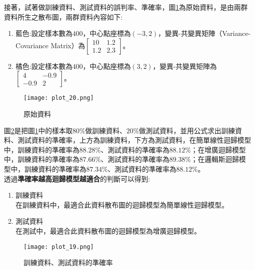 \documentclass[12pt, a4paper]{article}
\begin{document}
接著，試著做訓練資料、測試資料的誤判率、準確率，圖\;\ref{fig:plot_22.png}\;為原始資料，是由兩群資料所生之散布圖，兩群資料內容如下\;:
\begin{enumerate}
\item 藍色\;:\;設定樣本數為\;$400$\;，中心點座標為\;$(-3,2)$\;，變異\;-\;共變異矩陣（Variance-Covariance Matrix）為\;$\begin{bmatrix}10 & 1.2 \\1.2 & 2.3 \end{bmatrix}$\;。
\item 橘色\;:\;設定樣本數為\;$400$\;，中心點座標為\;$(3,2)$\;，變異\;-\;共變異矩陣為\;$\begin{bmatrix}4 & -0.9 \\-0.9 & 2 \end{bmatrix}$\;。
\end{enumerate}

\begin{figure}[H]
\centering
\texttt{[image: plot\_20.png]}
\caption{原始資料}
\label{fig:plot_22.png}
\end{figure}

圖\;\ref{fig:plot_21.png}\;是把圖\;\ref{fig:plot_22.png}\;中的樣本取\;$80\%$\;做訓練資料、\;$20\%$\;做測試資料，並用公式求出訓練資料、測試資料的準確率，上方為訓練資料，下方為測試資料，在簡單線性迴歸模型中，訓練資料的準確率為\;$88.28\%$\;、測試資料的準確率為\;$88.12\%$\;；在增廣迴歸模型中，訓練資料的準確率為\;$87.66\%$\;、測試資料的準確率為\;$89.38\%$\;；在邏輯斯迴歸模型中，訓練資料的準確率為\;$87.34\%$\;、測試資料的準確率為\;$88.12\%$\;。\\
透過\textbf{準確率越高迴歸模型越適合}的判斷可以得到\;:
\begin{enumerate}
\item 訓練資料\\
在訓練資料中，最適合此資料散布圖的迴歸模型為簡單線性迴歸模型。
\item 測試資料\\
在測試中，最適合此資料散布圖的迴歸模型為增廣迴歸模型。
\end{enumerate}

\begin{figure}[H]
\centering
\texttt{[image: plot\_19.png]}
\caption{訓練資料、測試資料的準確率}
\label{fig:plot_21.png}
\end{figure}
\end{document}
